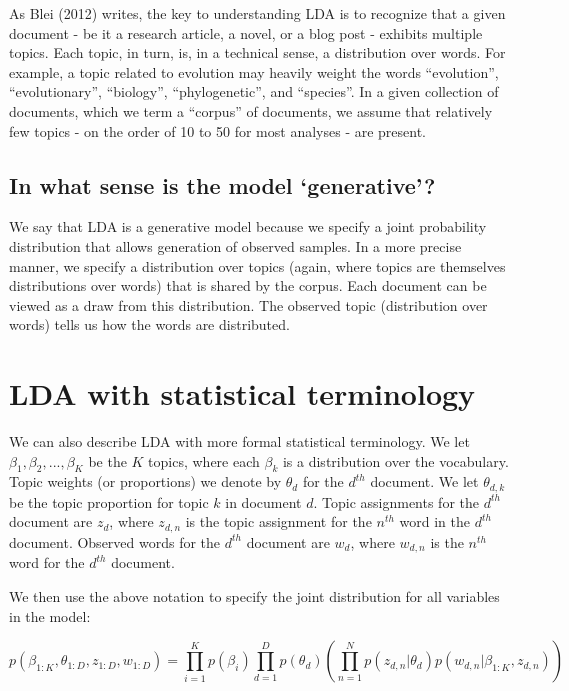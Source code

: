 \documentclass[12pt,]{article}
\begin{document}
As Blei (2012) writes, the key to understanding LDA is to recognize that
a given document - be it a research article, a novel, or a blog post -
exhibits multiple topics. Each topic, in turn, is, in a technical sense,
a distribution over words. For example, a topic related to evolution may
heavily weight the words ``evolution'', ``evolutionary'', ``biology'',
``phylogenetic'', and ``species''. In a given collection of documents,
which we term a ``corpus'' of documents, we assume that relatively few
topics - on the order of 10 to 50 for most analyses - are present.

\subsection{\texorpdfstring{In what sense is the model
`generative'?}{In what sense is the model generative?}}\label{in-what-sense-is-the-model-generative}

We say that LDA is a generative model because we specify a joint
probability distribution that allows generation of observed samples. In
a more precise manner, we specify a distribution over topics (again,
where topics are themselves distributions over words) that is shared by
the corpus. Each document can be viewed as a draw from this
distribution. The observed topic (distribution over words) tells us how
the words are distributed.

\section{LDA with statistical
terminology}\label{lda-with-statistical-terminology}

We can also describe LDA with more formal statistical terminology. We
let \(\beta_1, \beta_2, ..., \beta_K\) be the \(K\) topics, where each
\(\beta_k\) is a distribution over the vocabulary. Topic weights (or
proportions) we denote by \(\theta_d\) for the \(d^{th}\) document. We
let \(\theta_{d,k}\) be the topic proportion for topic \(k\) in document
\(d\). Topic assignments for the \(d^{th}\) document are \(z_d\), where
\(z_{d,n}\) is the topic assignment for the \(n^{th}\) word in the
\(d^{th}\) document. Observed words for the \(d^{th}\) document are
\(w_d\), where \(w_{d, n}\) is the \(n^{th}\) word for the \(d^{th}\)
document.

We then use the above notation to specify the joint distribution for all
variables in the model:

\[p(\beta_{1:K}, \theta_{1:D}, z_{1:D}, w_{1:D}) = \prod_{i = 1}^Kp(\beta_i)\prod_{d = 1}^Dp(\theta_d)\left( \prod_{n = 1}^N p(z_{d,n}|\theta_d)p(w_{d,n}|\beta_{1:K}, z_{d,n})\right)\]
\end{document}
